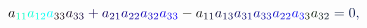 \documentclass[12pt]{article}
\begin{document}
\begin{displaymath}
{a} _ { \mathcolor[RGB]{0,255,180}{1} \mathcolor[RGB]{0,255,195}{1} } \mathcolor[RGB]{0,255,210}{a} _ { \mathcolor[RGB]{0,255,225}{1} \mathcolor[RGB]{0,255,240}{2} } \mathcolor[RGB]{0,255,255}{a} _ { \mathcolor[RGB]{15,0,0}{3} \mathcolor[RGB]{15,0,15}{3} } \mathcolor[RGB]{15,0,30}{a} _ { \mathcolor[RGB]{15,0,45}{3} \mathcolor[RGB]{15,0,60}{3} } \mathcolor[RGB]{15,0,75}{+} \mathcolor[RGB]{15,0,90}{a} _ { \mathcolor[RGB]{15,0,105}{2} \mathcolor[RGB]{15,0,120}{1} } \mathcolor[RGB]{15,0,135}{a} _ { \mathcolor[RGB]{15,0,150}{2} \mathcolor[RGB]{15,0,165}{2} } \mathcolor[RGB]{15,0,180}{a} _ { \mathcolor[RGB]{15,0,195}{3} \mathcolor[RGB]{15,0,210}{2} } \mathcolor[RGB]{15,0,225}{a} _ { \mathcolor[RGB]{15,0,240}{3} \mathcolor[RGB]{15,0,255}{3} } \mathcolor[RGB]{15,15,0}{-} \mathcolor[RGB]{15,15,15}{a} _ { \mathcolor[RGB]{15,15,30}{1} \mathcolor[RGB]{15,15,45}{1} } \mathcolor[RGB]{15,15,60}{a} _ { \mathcolor[RGB]{15,15,75}{1} \mathcolor[RGB]{15,15,90}{3} } \mathcolor[RGB]{15,15,105}{a} _ { \mathcolor[RGB]{15,15,120}{3} \mathcolor[RGB]{15,15,135}{1} } \mathcolor[RGB]{15,15,150}{a} _ { \mathcolor[RGB]{15,15,165}{3} \mathcolor[RGB]{15,15,180}{3} } \mathcolor[RGB]{15,15,195}{a} _ { \mathcolor[RGB]{15,15,210}{2} \mathcolor[RGB]{15,15,225}{2} } \mathcolor[RGB]{15,15,240}{a} _ { \mathcolor[RGB]{15,15,255}{3} \mathcolor[RGB]{15,30,0}{3} } \mathcolor[RGB]{15,30,15}{a} _ { \mathcolor[RGB]{15,30,30}{3} \mathcolor[RGB]{15,30,45}{2} } \mathcolor[RGB]{15,30,60}{=} \mathcolor[RGB]{15,30,75}{0} \mathcolor[RGB]{15,30,90}{,} \mathcolor[RGB]{15,30,105}{\,
}
\end{displaymath}
\end{document}

